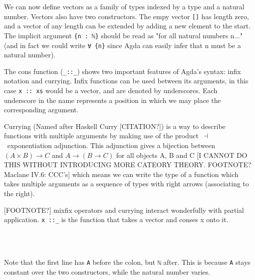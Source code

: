 We can now define vectors as a family of types indexed by a type and a natural number.
Vectors also have two constructors. The empy vector \texttt{[]} has length zero, and a vector of any length can be extended by adding a new element to the start.
The implicit argument \texttt{\{n~:~ℕ\}} should be read as "for all natural numbers n..." (and in fact we could write \texttt{∀~\{n\}} since Agda can easily infer that n must be a natural number).

The cons function (\texttt{\_::\_}) shows two important features of Agda's syntax: infix notation and currying.
Infix functions can be used between its arguments, in this case \texttt{x :: xs} would be a vector,
and are denoted by underscores. Each underscore in the name represents a position in which we may place
the corresponding argument.

Currying (Named after Haskell Curry [CITATION?]) is a way to describe functions with multiple arguments
by making use of the product~$\dashv$~exponentiation adjunction.
This adjunction gives a bijection between $(A \times B) \rightarrow C$ and $A \rightarrow (B \rightarrow C)$
for all objects A, B and C [I CANNOT DO THIS WITHOUT INTRODUCING MORE CATEORY THEORY. FOOTNOTE? Maclane IV.6: CCC's] which
means we can write the type of a function which takes multiple arguments as a sequence of types with right
arrows (associating to the right).

[FOOTNOTE?] mixfix operators and currying interact wonderfully with partial application. \texttt{x ::\_} is the
function that takes a vector and conses x onto it.
\begin{code}%
\>[0]\AgdaSpace{}%
\AgdaSpace{}%
\AgdaSymbol{(}\AgdaSpace{}%
\AgdaSymbol{:}\AgdaSpace{}%
\AgdaSymbol{)}\AgdaSpace{}%
\AgdaSymbol{:}\AgdaSpace{}%
\AgdaSpace{}%
\AgdaSpace{}%
\AgdaSpace{}%
\<%
\\
\>[0][@{}l@{\AgdaIndent{0}}]%
\>[2]\AgdaInductiveConstructor{[]}\AgdaSpace{}%
\AgdaSymbol{:}\AgdaSpace{}%
\AgdaSpace{}%
\AgdaSpace{}%
\<%
\\
%
\>[2]\AgdaOperator{\AgdaInductiveConstructor{\AgdaUnderscore{}::\AgdaUnderscore{}}}\AgdaSpace{}%
\AgdaSymbol{:}\AgdaSpace{}%
\AgdaSymbol{\{}\AgdaSpace{}%
\AgdaSymbol{:}\AgdaSpace{}%
\AgdaSymbol{\}}\AgdaSpace{}%
\AgdaSpace{}%
\AgdaSpace{}%
\AgdaSpace{}%
\AgdaSpace{}%
\AgdaSpace{}%
\AgdaSpace{}%
\AgdaSpace{}%
\AgdaSpace{}%
\AgdaSpace{}%
\AgdaSymbol{(}\AgdaSpace{}%
\AgdaSymbol{)}\<%
\end{code}
Note that the first line has \texttt{A} before the colon, but \texttt{ℕ} after.
This is because \texttt{A} stays constant over the two constructors, while the natural number varies.

